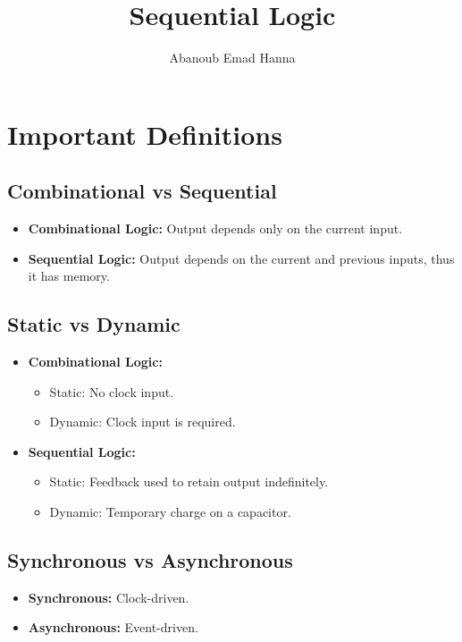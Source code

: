 \documentclass[11pt]{article}
\title{Sequential Logic}
\author{Abanoub Emad Hanna}
\date{}
\begin{document}
\maketitle

\section*{Important Definitions}
\subsection*{Combinational vs Sequential}
\begin{itemize}
    \item \textbf{Combinational Logic:} Output depends only on the current input.
    \item \textbf{Sequential Logic:} Output depends on the current and previous inputs, thus it has memory.
\end{itemize}

\subsection*{Static vs Dynamic}
\begin{itemize}
    \item \textbf{Combinational Logic:}
        \begin{itemize}
            \item Static: No clock input.
            \item Dynamic: Clock input is required.
        \end{itemize}
    \item \textbf{Sequential Logic:}
        \begin{itemize}
            \item Static: Feedback used to retain output indefinitely.
            \item Dynamic: Temporary charge on a capacitor.
        \end{itemize}
\end{itemize}

\subsection*{Synchronous vs Asynchronous}
\begin{itemize}
    \item \textbf{Synchronous:} Clock-driven.
    \item \textbf{Asynchronous:} Event-driven.
\end{itemize}
\end{document}

